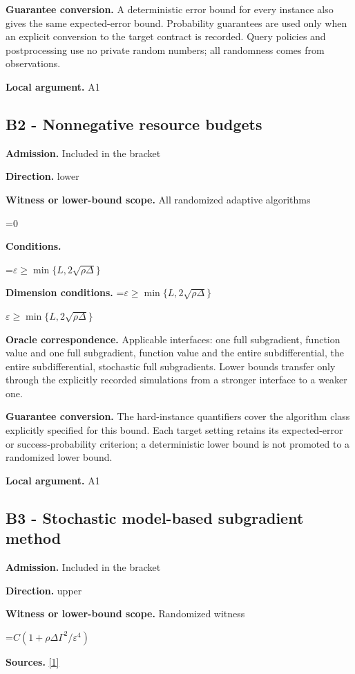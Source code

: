 \documentclass[10pt,a4paper]{article}
\newcommand{\AtlasMath}[1]{\par\begingroup\centering\setbox0=\hbox{$\displaystyle #1$}\ifdim\wd0>1.4\linewidth\typeout{ATLAS WIDE FORMULA: \the\wd0}\fi\ifdim\wd0>\linewidth\resizebox{\linewidth}{!}{\box0}\else\box0\fi\par\endgroup}
\newcommand{\AtlasInlineMath}[1]{\begingroup\setbox0=\hbox{$#1$}\ifdim\wd0>.4\linewidth\endgroup\AtlasMath{#1}\else\endgroup$#1$\fi}
\begin{document}
\textbf{Guarantee conversion.} A deterministic error bound for every instance also gives the same expected-error bound. Probability guarantees are used only when an explicit conversion to the target contract is recorded. Query policies and postprocessing use no private random numbers; all randomness comes from observations.

\textbf{Local argument.} A1

\subsection{B2 - Nonnegative resource budgets}
\textbf{Admission.} Included in the bracket

\textbf{Direction.} lower

\textbf{Witness or lower-bound scope.} All randomized adaptive algorithms

\AtlasMath{0}
\textbf{Conditions.} 
\AtlasMath{\varepsilon\ge\min\{L,2\sqrt{\rho\Delta}\}}


\textbf{Dimension conditions.} \AtlasInlineMath{\varepsilon\ge\min\{L,2\sqrt{\rho\Delta}\}}

\textbf{Oracle correspondence.} Applicable interfaces: one full subgradient, function value and one full subgradient, function value and the entire subdifferential, the entire subdifferential, stochastic full subgradients. Lower bounds transfer only through the explicitly recorded simulations from a stronger interface to a weaker one.

\textbf{Guarantee conversion.} The hard-instance quantifiers cover the algorithm class explicitly specified for this bound. Each target setting retains its expected-error or success-probability criterion; a deterministic lower bound is not promoted to a randomized lower bound.

\textbf{Local argument.} A1

\subsection{B3 - Stochastic model-based subgradient method}
\textbf{Admission.} Included in the bracket

\textbf{Direction.} upper

\textbf{Witness or lower-bound scope.} Randomized witness

\AtlasMath{C(1+\rho\Delta\Gamma^2/\varepsilon^4)}
\textbf{Sources.} \href{https://sites.math.washington.edu/~ddrusv/combined_model_based.pdf}{[1]}
\end{document}
